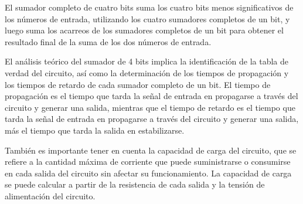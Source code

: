 \documentclass{article}
\begin{document}
\begin{multicols}{2}
El sumador completo de cuatro bits suma los cuatro bits menos significativos de los números de entrada, utilizando los cuatro sumadores completos de un bit, y luego suma los acarreos de los sumadores completos de un bit para obtener el resultado final de la suma de los dos números de entrada.

El análisis teórico del sumador de 4 bits implica la identificación de la tabla de verdad del circuito, así como la determinación de los tiempos de propagación y los tiempos de retardo de cada sumador completo de un bit. El tiempo de propagación es el tiempo que tarda la señal de entrada en propagarse a través del circuito y generar una salida, mientras que el tiempo de retardo es el tiempo que tarda la señal de entrada en propagarse a través del circuito y generar una salida, más el tiempo que tarda la salida en estabilizarse.

También es importante tener en cuenta la capacidad de carga del circuito, que se refiere a la cantidad máxima de corriente que puede suministrarse o consumirse en cada salida del circuito sin afectar su funcionamiento. La capacidad de carga se puede calcular a partir de la resistencia de cada salida y la tensión de alimentación del circuito.
\end{multicols}
\end{document}
